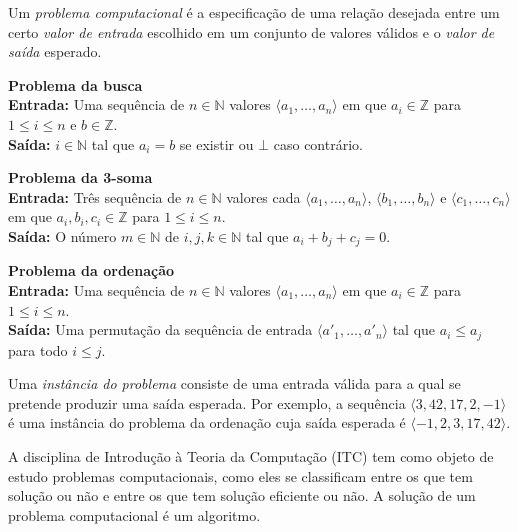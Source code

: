 Um {\em problema computacional} é a especificação de uma relação desejada entre um certo {\em valor de entrada} escolhido em um conjunto de valores válidos e o {\em valor de saída} esperado.

\begin{example}
  {\bf Problema da busca}\\

  {\bf Entrada:} Uma sequência de $n \in \mathbb{N}$ valores $\langle a_1, \dots, a_n \rangle$ em que $a_i \in \mathbb{Z}$ para $1 \leq i \leq n$ e $b \in \mathbb{Z}$.\\

  {\bf Saída:} $i \in \mathbb{N}$ tal que $a_i = b$ se existir ou $\bot$ caso contrário.
\end{example}

\begin{example}
  {\bf Problema da 3-soma}\\

  {\bf Entrada:} Três sequência de $n \in \mathbb{N}$ valores cada $\langle a_1, \dots, a_n \rangle$,  $\langle b_1, \dots, b_n \rangle$ e $\langle c_1, \dots, c_n \rangle$ em que $a_i, b_i, c_i \in \mathbb{Z}$ para $1 \leq i \leq n$.\\

  {\bf Saída:} O número $m \in \mathbb{N}$ de $i, j, k \in \mathbb{N}$ tal que $a_i + b_j + c_j = 0$.
\end{example}

\begin{example}
  {\bf Problema da ordenação}\\

  {\bf Entrada:} Uma sequência de $n \in \mathbb{N}$ valores $\langle a_1, \dots, a_n \rangle$ em que $a_i \in \mathbb{Z}$ para $1 \leq i \leq n$.\\

  {\bf Saída:} Uma permutação da sequência de entrada $\langle a'_1, \dots, a'_n \rangle$ tal que $a_i \leq a_j$ para todo $i \leq j$.
\end{example}

Uma {\em instância do problema} consiste de uma entrada válida para a qual se pretende produzir uma saída esperada.
Por exemplo, a sequência $\langle 3, 42, 17, 2, -1 \rangle$ é uma instância do problema da ordenação cuja saída esperada é $\langle -1, 2, 3, 17, 42 \rangle$.

A disciplina de Introdução à Teoria da Computação (ITC) tem como objeto de estudo problemas computacionais, como eles se classificam entre os que tem solução ou não e entre os que tem solução eficiente ou não.
A solução de um problema computacional é um algoritmo.

